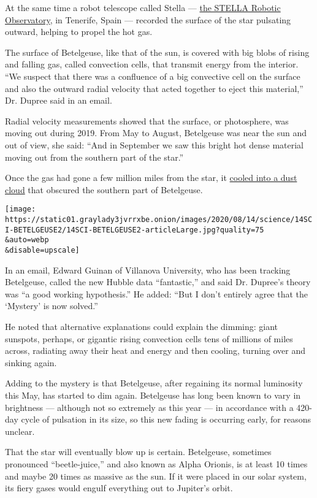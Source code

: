 At the same time a robot telescope called Stella ---
\href{https://www.aip.de/en/research/facilities/stella/}{the STELLA
Robotic Observatory}, in Tenerife, Spain --- recorded the surface of the
star pulsating outward, helping to propel the hot gas.

The surface of Betelgeuse, like that of the sun, is covered with big
blobs of rising and falling gas, called convection cells, that transmit
energy from the interior. ``We suspect that there was a confluence of a
big convective cell on the surface and also the outward radial velocity
that acted together to eject this material,'' Dr. Dupree said in an
email.

Radial velocity measurements showed that the surface, or photosphere,
was moving out during 2019. From May to August, Betelgeuse was near the
sun and out of view, she said: ``And in September we saw this bright hot
dense material moving out from the southern part of the star.''

Once the gas had gone a few million miles from the star, it
\href{https://www.nytimes3xbfgragh.onion/2020/02/14/science/betelgeuse-pictures-supernova.html}{cooled
into a dust cloud} that obscured the southern part of Betelgeuse.

\texttt{[image: https://static01.graylady3jvrrxbe.onion/images/2020/08/14/science/14SCI-BETELGEUSE2/14SCI-BETELGEUSE2-articleLarge.jpg?quality=75\\\&auto=webp\\\&disable=upscale]}

In an email, Edward Guinan of Villanova University, who has been
tracking Betelgeuse, called the new Hubble data ``fantastic,'' and said
Dr. Dupree's theory was ``a good working hypothesis.'' He added: ``But I
don't entirely agree that the `Mystery' is now solved.''

He noted that alternative explanations could explain the dimming: giant
sunspots, perhaps, or gigantic rising convection cells tens of millions
of miles across, radiating away their heat and energy and then cooling,
turning over and sinking again.

Adding to the mystery is that Betelgeuse, after regaining its normal
luminosity this May, has started to dim again. Betelgeuse has long been
known to vary in brightness --- although not so extremely as this year
--- in accordance with a 420-day cycle of pulsation in its size, so this
new fading is occurring early, for reasons unclear.

That the star will eventually blow up is certain. Betelgeuse, sometimes
pronounced ``beetle-juice,'' and also known as Alpha Orionis, is at
least 10 times and maybe 20 times as massive as the sun. If it were
placed in our solar system, its fiery gases would engulf everything out
to Jupiter's orbit.

